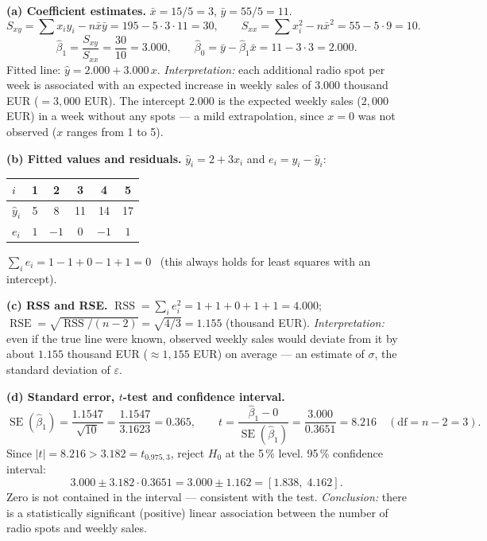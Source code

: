 \documentclass[11pt,a4paper]{article}
\begin{document}
\ifdefined\withsolutions
\begin{solutionbox}
\textbf{(a) Coefficient estimates.} $\bar{x}=15/5=3$, $\bar{y}=55/5=11$.
\[
S_{xy}=\sum x_iy_i-n\bar{x}\bar{y}=195-5\cdot 3\cdot 11=30,\qquad
S_{xx}=\sum x_i^2-n\bar{x}^2=55-5\cdot 9=10.
\]
\[
\hat{\beta}_1=\frac{S_{xy}}{S_{xx}}=\frac{30}{10}=3.000,\qquad
\hat{\beta}_0=\bar{y}-\hat{\beta}_1\bar{x}=11-3\cdot 3=2.000.
\]
Fitted line: $\hat{y}=2.000+3.000\,x$.
\emph{Interpretation:} each additional radio spot per week is associated with an expected
increase in weekly sales of $3.000$ thousand EUR ($=3{,}000$ EUR). The intercept $2.000$ is the
expected weekly sales ($2{,}000$ EUR) in a week without any spots --- a mild extrapolation,
since $x=0$ was not observed ($x$ ranges from 1 to 5).

\medskip
\textbf{(b) Fitted values and residuals.} $\hat{y}_i=2+3x_i$ and $e_i=y_i-\hat{y}_i$:
\begin{center}
\begin{tabular}{lccccc}
\toprule
$i$ & 1 & 2 & 3 & 4 & 5\\
\midrule
$\hat{y}_i$ & 5 & 8 & 11 & 14 & 17\\
$e_i$ & $1$ & $-1$ & $0$ & $-1$ & $1$\\
\bottomrule
\end{tabular}
\end{center}
$\sum_i e_i = 1-1+0-1+1 = 0$ \checkmark\ (this always holds for least squares with an intercept).

\medskip
\textbf{(c) RSS and RSE.}
$\operatorname{RSS}=\sum_i e_i^2 = 1+1+0+1+1 = 4.000$;
$\operatorname{RSE}=\sqrt{\operatorname{RSS}/(n-2)}=\sqrt{4/3}=1.155$ (thousand EUR).
\emph{Interpretation:} even if the true line were known, observed weekly sales would deviate
from it by about $1.155$ thousand EUR ($\approx 1{,}155$ EUR) on average --- an estimate of
$\sigma$, the standard deviation of $\varepsilon$.

\medskip
\textbf{(d) Standard error, $t$-test and confidence interval.}
\[
\operatorname{SE}(\hat{\beta}_1)=\frac{1.1547}{\sqrt{10}}=\frac{1.1547}{3.1623}=0.365,\qquad
t=\frac{\hat{\beta}_1-0}{\operatorname{SE}(\hat{\beta}_1)}=\frac{3.000}{0.3651}=8.216
\quad(\text{df}=n-2=3).
\]
Since $|t|=8.216 > 3.182=t_{0.975,3}$, reject $H_0$ at the 5\,\% level.
95\,\% confidence interval:
\[
3.000 \pm 3.182\cdot 0.3651 = 3.000 \pm 1.162 = [1.838,\; 4.162].
\]
Zero is not contained in the interval --- consistent with the test.
\emph{Conclusion:} there is a statistically significant (positive) linear association between
the number of radio spots and weekly sales.


\end{solutionbox}
\end{document}

